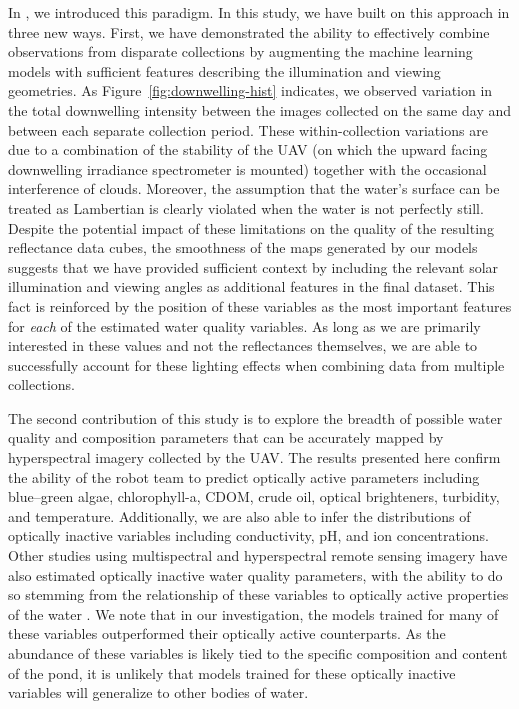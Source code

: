 \documentclass[remotesensing,article,accept,pdftex,moreauthors]{Definitions/mdpi}
\begin{document}
In \cite{robotTeam1}, we introduced this paradigm. In this study, we have built on this approach in three new ways. First, we have demonstrated the ability to effectively combine observations from disparate collections by augmenting the machine learning models with sufficient features describing the illumination and viewing geometries. As Figure~\ref{fig:downwelling-hist} indicates, we observed variation in the total downwelling intensity between the images collected on the same day and between each separate collection period. These within-collection variations are due to a combination of the stability of the UAV (on which the upward facing downwelling irradiance spectrometer is mounted) together with the occasional interference of clouds. Moreover, the assumption that the water's surface can be treated as Lambertian is clearly violated when the water is not perfectly still. Despite the potential impact of these limitations on the quality of the resulting reflectance data cubes, the smoothness of the maps generated by our models suggests that we have provided sufficient context by including the relevant solar illumination and viewing angles as additional features in the final dataset.  This fact is reinforced by the position of these variables as the most important features for \textit{each} of the estimated water quality variables. As long as we are primarily interested in these values and not the reflectances themselves, we are able to successfully account for these lighting effects when combining data from multiple collections.

The second contribution of this study is to explore the breadth of possible water quality and composition parameters that can be accurately mapped by hyperspectral imagery collected by the UAV. The results presented here confirm the ability of the robot team to predict optically active parameters including blue--green algae, chlorophyll-a, CDOM, crude oil, optical brighteners, turbidity, and temperature. Additionally, we are also able to infer the distributions of optically inactive variables including conductivity, pH, and ion concentrations. Other studies using multispectral and hyperspectral remote sensing imagery have also estimated optically inactive water quality parameters, with the ability to do so stemming from the relationship of these variables to optically active properties of the water \cite{vakili2020determination,guo2021machine,niu2021deep}. We note that in our investigation, the models trained for many of these variables outperformed their optically active counterparts. As the abundance of these variables is likely tied to the specific composition and content of the pond, it is unlikely that models trained for these optically inactive variables will generalize to other bodies of water. 
\end{document}
